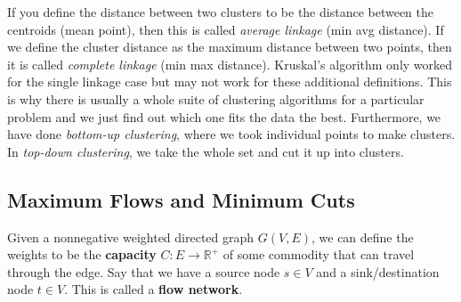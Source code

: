   If you define the distance between two clusters to be the distance between the centroids (mean point), then this is called \textit{average linkage} (min avg distance). If we define the cluster distance as the maximum distance between two points, then it is called \textit{complete linkage} (min max distance). Kruskal's algorithm only worked for the single linkage case but may not work for these additional definitions. This is why there is usually a whole suite of clustering algorithms for a particular problem and we just find out which one fits the data the best. Furthermore, we have done \textit{bottom-up clustering}, where we took individual points to make clusters. In \textit{top-down clustering}, we take the whole set and cut it up into clusters.  

\subsection{Maximum Flows and Minimum Cuts} 

  \begin{definition}
    Given a nonnegative weighted directed graph $G(V, E)$, we can define the weights to be the \textbf{capacity} $C: E \rightarrow \mathbb{R}^+$ of some commodity that can travel through the edge. Say that we have a source node $s \in V$ and a sink/destination node $t \in V$. This is called a \textbf{flow network}.
  \end{definition}

